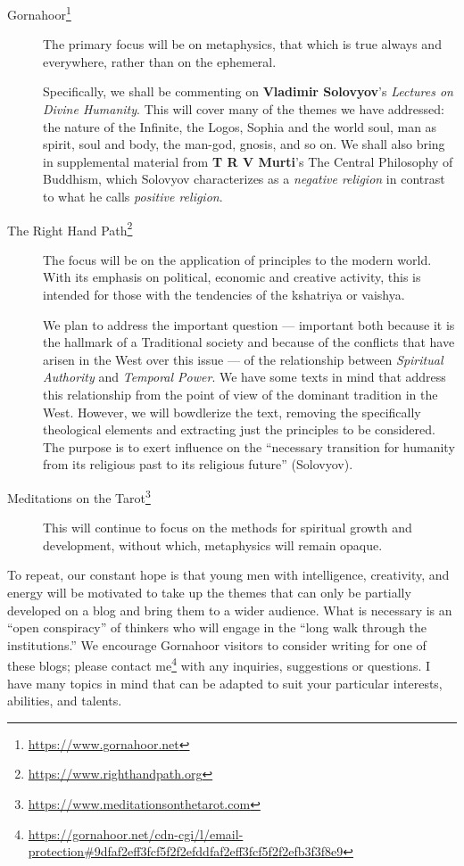 \begin{description}

\item[Gornahoor\footnote{\url{https://www.gornahoor.net}}]

The primary focus will be on metaphysics, that which is true always and everywhere, rather than on the ephemeral.

Specifically, we shall be commenting on \textbf{Vladimir Solovyov}'s \textit{Lectures on Divine Humanity}. This will cover many of the themes we have addressed: the nature of the Infinite, the Logos, Sophia and the world soul, man as spirit, soul and body, the man-god, gnosis, and so on. We shall also bring in supplemental material from \textbf{T R V Murti}'s The Central Philosophy of Buddhism, which Solovyov characterizes as a \emph{negative religion} in contrast to what he calls \emph{positive religion}.

\item[The Right Hand Path\footnote{\url{https://www.righthandpath.org}}]

The focus will be on the application of principles to the modern world. With its emphasis on political, economic and creative activity, this is intended for those with the tendencies of the kshatriya or vaishya.

We plan to address the important question --- important both because it is the hallmark of a Traditional society and because of the conflicts that have arisen in the West over this issue --- of the relationship between \emph{Spiritual Authority} and \emph{Temporal Power}. We have some texts in mind that address this relationship from the point of view of the dominant tradition in the West. However, we will bowdlerize the text, removing the specifically theological elements and extracting just the principles to be considered. The purpose is to exert influence on the ``necessary transition for humanity from its religious past to its religious future'' (Solovyov).

\item[Meditations on the Tarot\footnote{\url{https://www.meditationsonthetarot.com}}] This will continue to focus on the methods for spiritual growth and development, without which, metaphysics will remain opaque.
\end{description}

To repeat, our constant hope is that young men with intelligence, creativity, and energy will be motivated to take up the themes that can only be partially developed on a blog and bring them to a wider audience. What is necessary is an ``open conspiracy'' of thinkers who will engage in the ``long walk through the institutions.'' We encourage Gornahoor visitors to consider writing for one of these blogs; please contact me\footnote{\url{https://gornahoor.net/cdn-cgi/l/email-protection\#9dfaf2eff3fcf5f2f2efddfaf2eff3fcf5f2f2efb3f3f8e9}} with any inquiries, suggestions or questions. I have many topics in mind that can be adapted to suit your particular interests, abilities, and talents.


